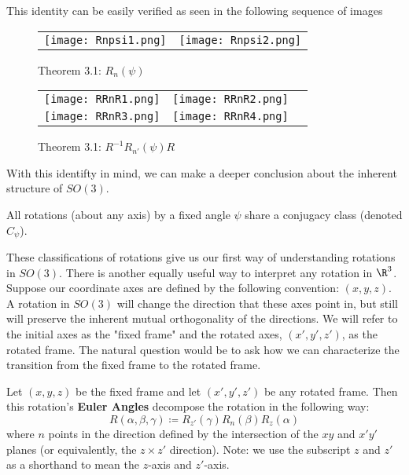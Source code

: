 This identity can be easily verified as seen in the following sequence of images\\

\begin{figure}[H]
	\centering
	\begin{tabular}{cc}
		\texttt{[image: Rnpsi1.png]}
&
		\texttt{[image: Rnpsi2.png]}
	\end{tabular}
	\caption{Theorem 3.1: $R_n(\psi)$}
	

\end{figure}
\begin{figure}[H]
	\centering

	\begin{tabular}{ccc}
		\texttt{[image: RRnR1.png]}
		&
		\texttt{[image: RRnR2.png]}\\
		\texttt{[image: RRnR3.png]}
		&
		\texttt{[image: RRnR4.png]}

	\end{tabular}
	\caption{Theorem 3.1: $R^{-1}R_{n'}(\psi)R$}
	

\end{figure}



With this identifty in mind, we can make a deeper conclusion about the inherent structure of $SO(3)$.

\begin{corrolary}
	All rotations (about any axis) by a fixed angle $\psi$ share a conjugacy class (denoted $C_\psi$).
\end{corrolary}

These classifications of rotations give us our first way of understanding rotations in $SO(3)$. There is another equally useful way to interpret any rotation in $\R^3$. Suppose our coordinate axes are defined by the following convention: $(x,y,z)$. A rotation in $SO(3)$ will change the direction that these axes point in, but still will preserve the inherent mutual orthogonality of the directions. We will refer to the initial axes as the "fixed frame" and the rotated axes, $(x',y',z')$, as the rotated frame. The natural question would be to ask how we can characterize the transition from the fixed frame to the rotated frame.

\begin{definition}
	Let $(x,y,z)$ be the fixed frame and let $(x',y',z')$ be any rotated frame. Then this rotation's \textbf{Euler Angles} decompose the rotation in the following way:
$$R(\alpha,\beta,\gamma) \coloneq R_{z'}(\gamma)R_n(\beta)R_z(\alpha)$$
where $n$ points in the direction defined by the intersection of the $xy$ and $x'y'$ planes (or equivalently, the $z\times z'$ direction). Note: we use the subscript $z$ and $z'$ as a shorthand to mean the $z$-axis and $z'$-axis.
\end{definition}

